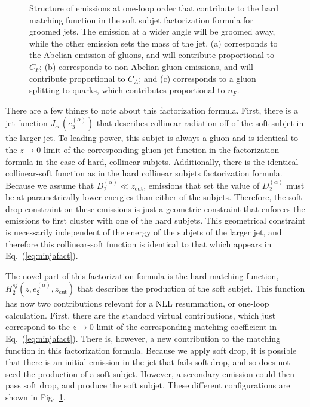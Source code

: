 \documentclass[a4paper,11pt]{article}
\newcommand{\ecf}[2]{e_{#1}^{(#2)}}
\def\zcut{z_{\text{cut}}}
\newcommand{\Dobs}[2]{D_{#1}^{(#2)}}
\DeclareRobustCommand{\Fig}[1]{Fig.~\ref{#1}}
\DeclareRobustCommand{\Eq}[1]{Eq.~(\ref{#1})}
\begin{document}
\begin{figure}
\begin{center}
\end{center}
\caption{
Structure of emissions at one-loop order that contribute to the hard matching function in the soft subjet factorization formula for groomed jets.  The emission at a wider angle will be groomed away, while the other emission sets the mass of the jet.  (a) corresponds to the Abelian emission of gluons, and will contribute proportional to $C_F$; (b) corresponds to non-Abelian gluon emissions, and will contribute proportional to $C_A$; and (c) corresponds to a gluon splitting to quarks, which contributes proportional to $n_F$.
}
\label{fig:soft_subjet_matching}
\end{figure}

There are a few things to note about this factorization formula.  First, there is a jet function $J_{sc}(\ecf{3}{\alpha})$ that describes collinear radiation off of the soft subjet in the larger jet.  To leading power, this subjet is always a gluon and is identical to the $z\to 0$ limit of the corresponding gluon jet function in the factorization formula in the case of hard, collinear subjets.  Additionally, there is the identical collinear-soft function as in the hard collinear subjets factorization formula.  Because we assume that $\Dobs{2}{\alpha}\ll \zcut$, emissions that set the value of $\Dobs{2}{\alpha}$ must be at parametrically lower energies than either of the subjets.  Therefore, the soft drop constraint on these emissions is just a geometric constraint that enforces the emissions to first cluster with one of the hard subjets.  This geometrical constraint is necessarily independent of the energy of the subjets of the larger jet, and therefore this collinear-soft function is identical to that which appears in \Eq{eq:ninjafact}.

The novel part of this factorization formula is the hard matching function, $H_2^{sj}(z,\ecf{2}{\alpha},\zcut)$ that describes the production of the soft subjet.  This function has now two contributions relevant for a NLL resummation, or one-loop calculation.  First, there are the standard virtual contributions, which just correspond to the $z\to 0$ limit of the corresponding matching coefficient in \Eq{eq:ninjafact}.  There is, however, a new contribution to the matching function in this factorization formula.  Because we apply soft drop, it is possible that there is an initial emission in the jet that fails soft drop, and so does not seed the production of a soft subjet.  However, a secondary emission could then pass soft drop, and produce the soft subjet. These different configurations are shown in \Fig{fig:soft_subjet_matching}.
\end{document}
